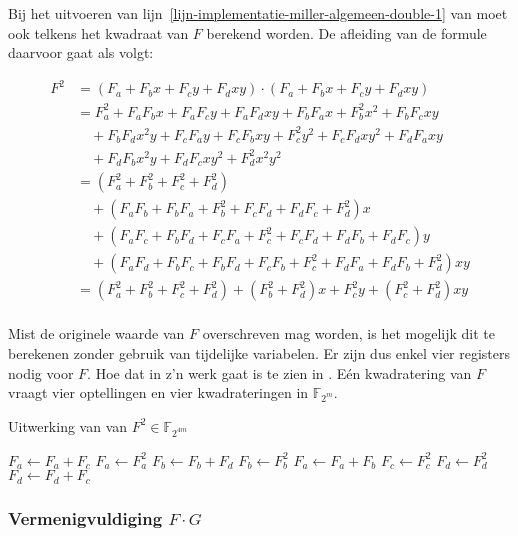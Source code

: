 Bij het uitvoeren van lijn~\ref{lijn-implementatie-miller-algemeen-double-1} van  moet ook telkens het kwadraat van $F$ berekend worden. De afleiding van de formule daarvoor gaat als volgt:

\[\begin{aligned}
F^2	&= (F_a + F_b x + F_c y + F_d xy) \cdot (F_a + F_b x + F_c y + F_d xy)\\
		&= F_a^2 + F_a F_b x + F_a F_c y + F_a F_d xy + F_b F_a x + F_b^2 x^2 + F_b F_c xy\\
			&\quad + F_b F_d x^2y + F_c F_a y + F_c F_b xy + F_c^2 y^2 + F_c F_d xy^2 + F_d F_a xy\\
			&\quad + F_d F_b x^2y + F_d F_c xy^2 + F_d^2 x^2 y^2\\
		&= (F_a^2 + F_b^2 + F_c^2 + F_d^2)\\
			&\quad + (F_a F_b + F_b F_a + F_b^2 + F_c F_d + F_d F_c + F_d^2)x\\
			&\quad + (F_a F_c + F_b F_d + F_c F_a + F_c^2 + F_c F_d + F_d F_b + F_d F_c)y\\
			&\quad + (F_a F_d + F_b F_c + F_b F_d + F_c F_b + F_c^2 + F_d F_a + F_d F_b + F_d^2)xy\\
		&= (F_a^2 + F_b^2 + F_c^2 + F_d^2) + (F_b^2 + F_d^2)x + F_c^2 y + (F_c^2 + F_d^2)xy\\
\end{aligned}\]

Mist de originele waarde van $F$ overschreven mag worden, is het mogelijk dit te berekenen zonder gebruik van tijdelijke variabelen. Er zijn dus enkel vier registers nodig voor $F$. Hoe dat in z'n werk gaat is te zien in . E\'en kwadratering van $F$ vraagt vier optellingen en vier kwadrateringen in $\mathbb{F}_{2^m}$.

\begin{algorithm}[h]
	\caption{Uitwerking van van $F^2 \in \mathbb{F}_{2^{4m}}$}
	\label{algoritme-implementatie-miller-f-square}
	$F_a \gets F_a + F_c$\;
	$F_a \gets F_a^2$\;
	$F_b \gets F_b + F_d$\;
	$F_b \gets F_b^2$\;
	$F_a \gets F_a + F_b$\;
	$F_c \gets F_c^2$\;
	$F_d \gets F_d^2$\;
	$F_d \gets F_d + F_c$\;
\end{algorithm}

\subsubsection{Vermenigvuldiging $F \cdot G$}

